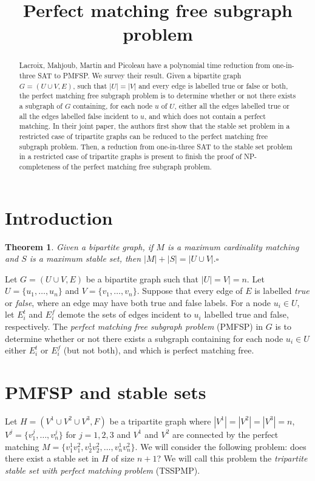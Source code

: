 \documentclass{article}
\title{Perfect matching free subgraph problem}
\theoremstyle{plain}
\newtheorem{theorem}{Theorem}
\theoremstyle{definition}
\begin{document}
\maketitle

\begin{abstract}
Lacroix, Mahjoub, Martin and Picoleau have a polynomial time reduction from one-in-three SAT to PMFSP. We survey their result. Given a bipartite graph $G=(U\cup V,E)$, such that $|U|=|V|$ and every edge is labelled true or false or both, the perfect matching free subgraph problem is to determine whether or not there exists a subgraph of $G$ containing, for each node $u$ of $U$, either all the edges labelled true or all the edges labelled false incident to $u$, and which does not contain a perfect matching. In their joint paper, the authors first show that the stable set problem in a restricted case of tripartite graphs can be reduced to the perfect matching free subgraph problem. Then, a reduction from one-in-three SAT to the stable set problem in a restricted case of tripartite graphs is present to finish the proof of NP-completeness of the perfect matching free subgraph problem.
\end{abstract}

\section{Introduction}
\begin{theorem}
\label{theorem_1}
Given a bipartite graph, if $M$ is a maximum cardinality matching and $S$ is a maximum stable set, then $|M|+|S|=|U\cup V|.$\hfill$\square$
\end{theorem}

Let $G=(U\cup V,E)$ be a bipartite graph such that $|U|=V|=n$. Let $U=\{u_1,\dots,u_n\}$ and $V=\{v_1,\dots,v_n\}$. Suppose that every edge of $E$ is labelled {\em true} or {\em false}, where an edge may have both true and false labels. For a node $u_i\in U$, let $E_i^t$ and $E_i^f$ demote the sets of edges incident to $u_i$ labelled true and false, respectively. The {\em perfect matching free subgraph problem} (PMFSP) in $G$ is to determine whether or not there exists a subgraph containing for each node $u_i\in U$ either $E_i^t$ or $E_i^f$ (but not both), and which is perfect matching free.

\section{PMFSP and stable sets}
Let $H=(V^1\cup V^2\cup V^3,F)$ be a tripartite graph where $|V^1|=|V^2|=|V^3|=n$, $V^j=\{v^j_1,\dots,v^j_n\}$ for $j=1,2,3$ and $V^1$ and $V^2$ are connected by the perfect matching $M=\{v^1_1v^2_1,v^1_2v^2_2,\dots,v^1_nv^2_n\}$. We will consider the following problem: does there exist a stable set in $H$ of size $n+1$? We will call this problem the {\em tripartite stable set with perfect matching problem} (TSSPMP).
\end{document}
